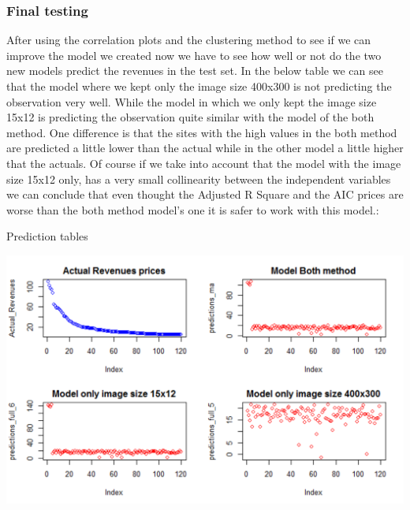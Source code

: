 \documentclass{book}
\begin{document}
\subsubsection{Final testing}
After using the correlation plots and the clustering method to see if we can improve the model we created now we have to see how well or not do the two new models predict the revenues in the test set. In the below table we can see that the model where we kept only the image size 400x300 is not predicting the observation very well. While the model in which we only kept the image size 15x12 is predicting the observation quite similar with the model of the both method. One difference is that the sites with the high values in the both method are predicted a little lower than the actual while in the other model a little higher that the actuals. Of course if we take into account that the model with the image size 15x12 only, has a very small collinearity between the independent variables we can conclude that even thought the Adjusted R Square and the AIC prices are worse than the both method model's one it is safer to work with this model.:
\begin{table}[H]
\centering
\caption{Prediction tables}
\begin{center}
\includegraphics[scale=1]{../R/photos/103_mod_comp.png}
\end{center}
\end{table}
 

\pagebreak  
\end{document}
